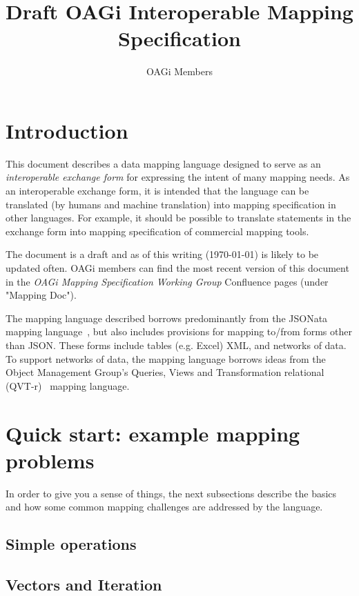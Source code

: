 \documentclass[9pt,letterpaper]{article}
\begin{document}
\title{Draft OAGi Interoperable Mapping Specification}
\author{OAGi Members}
\maketitle

\section{Introduction}
This document describes a data mapping language designed to serve as an \textit{interoperable exchange form} for expressing the intent of many mapping needs.
As an interoperable exchange form, it is intended that the language can be translated (by humans and machine translation) into mapping specification in other languages.
For example, it should be possible to translate statements in the exchange form into mapping specification of commercial mapping tools.

The document is a draft and as of this writing (\today) is likely to be updated often.
OAGi members can find the most recent version of this document in the \textit{OAGi Mapping Specification Working Group} Confluence pages (under "Mapping Doc").

The mapping language described borrows predominantly from the JSONata mapping language~\cite{Jsonata.org2021}, but also includes provisions for mapping to/from forms other than JSON.
These forms include tables (e.g. Excel) XML, and networks of data.
To support networks of data, the mapping language borrows ideas from the Object Management Group's Queries, Views and Transformation relational (QVT-r)~\cite{ObjectManagementGroup2016b} mapping language.

\section{Quick start: example mapping problems}

In order to give you a sense of things, the next subsections describe the basics and how some common mapping challenges are addressed by the language.

\subsection{Simple operations}

\subsection{Vectors and Iteration}
\end{document}

